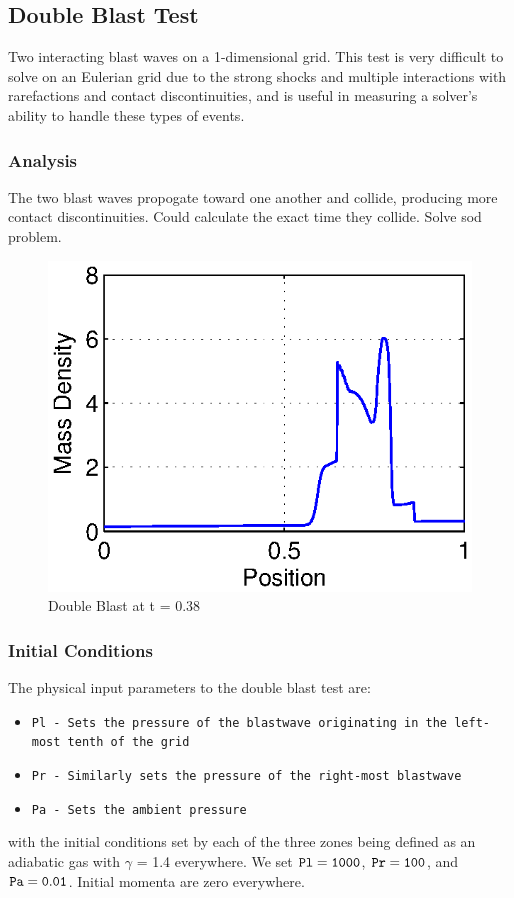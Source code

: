 

\subsection{Double Blast Test}

Two interacting blast waves on a 1-dimensional grid. This test is very difficult to solve on an Eulerian grid due to the 
strong shocks and multiple interactions with rarefactions and contact discontinuities, and is useful in measuring a 
solver's ability to handle these types of events. 

\subsubsection{Analysis}

The two blast waves propogate toward one another and collide, producing more contact discontinuities.
Could calculate the exact time they collide. Solve sod problem.

\begin{figure}
\begin{center}
\includegraphics{DoubleBlast.eps}
\caption{Double Blast at t = 0.38}
\end{center}
\end{figure}
\subsubsection{Initial Conditions}

The physical input parameters to the double blast test are:
\begin{itemize}
\item \tt{Pl} - Sets the pressure of the blastwave originating in the left-most tenth of the grid
\item \tt{Pr} - Similarly sets the pressure of the right-most blastwave
\item \tt{Pa} - Sets the ambient pressure
\end{itemize}


with the initial conditions set by each of the three zones being defined as an adiabatic gas with $\gamma$ = 1.4 everywhere. 
We set $\tt{Pl} = 1000$, $\tt{Pr} = 100$, and $\tt{Pa} = 0.01$. Initial momenta are zero everywhere.
